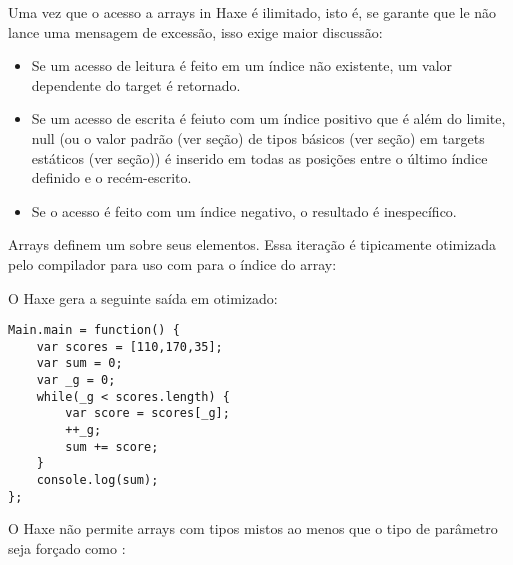 
Uma vez que o acesso a arrays in Haxe é ilimitado, isto é, se garante que le não lance uma mensagem de excessão, isso exige maior discussão:
\begin{itemize}
    \item Se um acesso de leitura é feito em um índice não existente, um valor dependente do target é retornado.
    \item Se um acesso de escrita é feiuto com um índice positivo que é além do limite, null (ou o valor padrão (ver seção) de tipos básicos (ver seção) em targets estáticos (ver seção)) é inserido em todas as posições entre o último índice definido e o recém-escrito.
    \item Se o acesso é feito com um índice negativo, o resultado é inespecífico.
\end{itemize}

Arrays definem um  sobre seus elementos. Essa iteração é tipicamente otimizada pelo compilador para uso com   para o índice do array:


O Haxe gera a seguinte saída em  otimizado:

\begin{lstlisting}
Main.main = function() {
    var scores = [110,170,35];
    var sum = 0;
    var _g = 0;
    while(_g < scores.length) {
        var score = scores[_g];
        ++_g;
        sum += score;
    }
    console.log(sum);
};
\end{lstlisting}

O Haxe não permite arrays com tipos mistos ao menos que o tipo de parâmetro seja forçado como :

